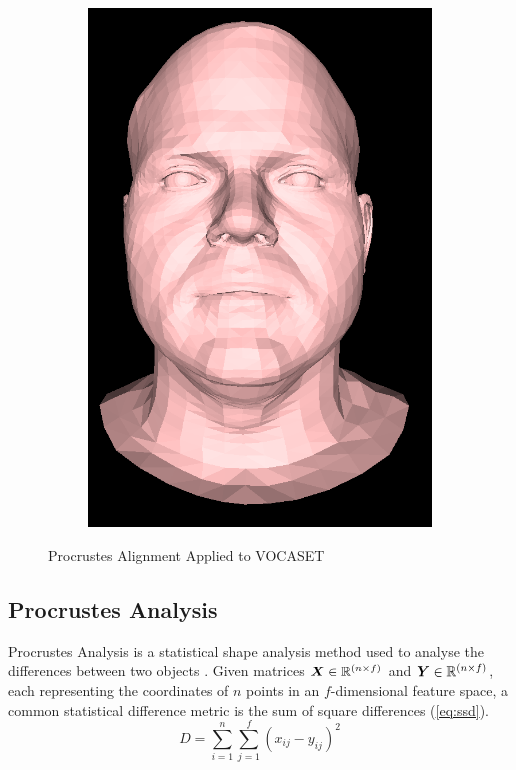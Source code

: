 \begin{figure}[h]
\begin{subfigure}[b]{0.4\textwidth}
        \includegraphics[width=\textwidth]{figures/subject2_aligned.png}
    \end{subfigure}
    \caption{Procrustes Alignment Applied to VOCASET \cite{Cudeiro2019}}\label{fig:VOCASET_Alignment}
\end{figure}

\subsection{Procrustes Analysis} \label{sec:procrustes_analysis}
Procrustes Analysis is a statistical shape analysis method used to analyse the differences between two objects \cite{Krzanowski2000}.
Given matrices ${\boldsymbol{{X}}} \in \mathbb{R}^{(n\times f)}$ and ${\boldsymbol{{Y}}} \in \mathbb{R}^{(n\times f)}$, each representing the coordinates of $n$ points in an $f$-dimensional feature space, a common statistical difference metric is the sum of square differences (\ref{eq:ssd}).
\begin{equation}
    \label{eq:ssd}
    D = \sum_{i=1}^{n} \sum_{j=1}^{f} (x_{ij} - y_{ij})^2
\end{equation}

